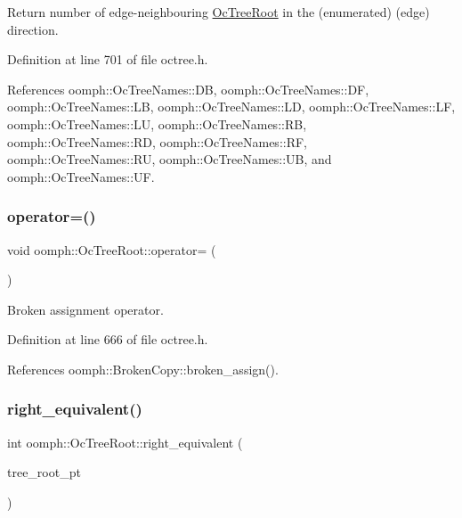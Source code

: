 Return number of edge-\/neighbouring \hyperlink{classoomph_1_1OcTreeRoot}{Oc\+Tree\+Root} in the (enumerated) (edge) direction. 



Definition at line 701 of file octree.\+h.



References oomph\+::\+Oc\+Tree\+Names\+::\+DB, oomph\+::\+Oc\+Tree\+Names\+::\+DF, oomph\+::\+Oc\+Tree\+Names\+::\+LB, oomph\+::\+Oc\+Tree\+Names\+::\+LD, oomph\+::\+Oc\+Tree\+Names\+::\+LF, oomph\+::\+Oc\+Tree\+Names\+::\+LU, oomph\+::\+Oc\+Tree\+Names\+::\+RB, oomph\+::\+Oc\+Tree\+Names\+::\+RD, oomph\+::\+Oc\+Tree\+Names\+::\+RF, oomph\+::\+Oc\+Tree\+Names\+::\+RU, oomph\+::\+Oc\+Tree\+Names\+::\+UB, and oomph\+::\+Oc\+Tree\+Names\+::\+UF.

\mbox{\label{classoomph_1_1OcTreeRoot_a9301f0c4839b8e277822ab0d860f4d11}} 
\subsubsection{\texorpdfstring{operator=()}{operator=()}}
{\footnotesize\ttfamily void oomph\+::\+Oc\+Tree\+Root\+::operator= (\begin{DoxyParamCaption}\item[{const \hyperlink{classoomph_1_1OcTreeRoot}{Oc\+Tree\+Root} \&}]{ }\end{DoxyParamCaption})\hspace{0.3cm}{\ttfamily [inline]}}



Broken assignment operator. 



Definition at line 666 of file octree.\+h.



References oomph\+::\+Broken\+Copy\+::broken\+\_\+assign().

\mbox{\label{classoomph_1_1OcTreeRoot_a497950cb0812be6a95be8af658a03fb6}} 
\subsubsection{\texorpdfstring{right\+\_\+equivalent()}{right\_equivalent()}}
{\footnotesize\ttfamily int oomph\+::\+Oc\+Tree\+Root\+::right\+\_\+equivalent (\begin{DoxyParamCaption}\item[{\hyperlink{classoomph_1_1TreeRoot}{Tree\+Root} $\ast$}]{tree\+\_\+root\+\_\+pt }\end{DoxyParamCaption})\hspace{0.3cm}{\ttfamily [inline]}}



